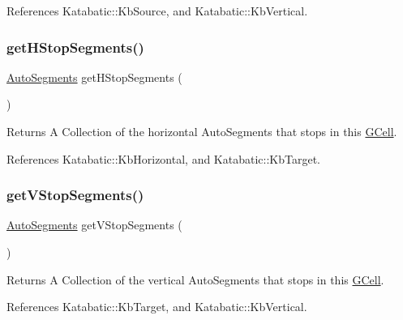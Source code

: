 References Katabatic\+::\+Kb\+Source, and Katabatic\+::\+Kb\+Vertical.

\mbox{\label{classKatabatic_1_1GCell_a77beccf65527a330f15bed2aba4f9dea}} 
\subsubsection{\texorpdfstring{get\+H\+Stop\+Segments()}{getHStopSegments()}}
{\footnotesize\ttfamily \hyperlink{namespaceKatabatic_a2221b0ddbc24f331809fc86f98e38041}{Auto\+Segments} get\+H\+Stop\+Segments (\begin{DoxyParamCaption}{ }\end{DoxyParamCaption})}

\begin{DoxyReturn}{Returns}
A Collection of the horizontal Auto\+Segments that stops in this \hyperlink{classKatabatic_1_1GCell}{G\+Cell}. 
\end{DoxyReturn}


References Katabatic\+::\+Kb\+Horizontal, and Katabatic\+::\+Kb\+Target.

\mbox{\label{classKatabatic_1_1GCell_a2f0f038f5700b7b55f22829c5d43aa07}} 
\subsubsection{\texorpdfstring{get\+V\+Stop\+Segments()}{getVStopSegments()}}
{\footnotesize\ttfamily \hyperlink{namespaceKatabatic_a2221b0ddbc24f331809fc86f98e38041}{Auto\+Segments} get\+V\+Stop\+Segments (\begin{DoxyParamCaption}{ }\end{DoxyParamCaption})}

\begin{DoxyReturn}{Returns}
A Collection of the vertical Auto\+Segments that stops in this \hyperlink{classKatabatic_1_1GCell}{G\+Cell}. 
\end{DoxyReturn}


References Katabatic\+::\+Kb\+Target, and Katabatic\+::\+Kb\+Vertical.

